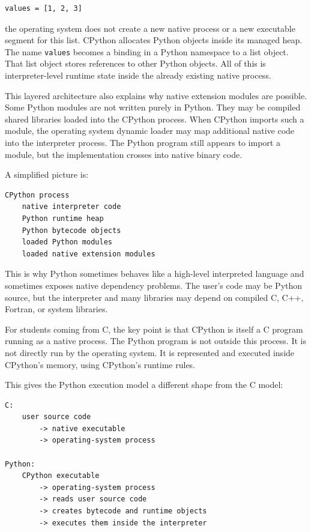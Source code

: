 \begin{verbatim}
values = [1, 2, 3]
\end{verbatim}

the operating system does not create a new native process or a new executable segment for this list. CPython allocates Python objects inside its managed heap. The name \texttt{values} becomes a binding in a Python namespace to a list object. That list object stores references to other Python objects. All of this is interpreter-level runtime state inside the already existing native process.

This layered architecture also explains why native extension modules are possible. Some Python modules are not written purely in Python. They may be compiled shared libraries loaded into the CPython process. When CPython imports such a module, the operating system dynamic loader may map additional native code into the interpreter process. The Python program still appears to import a module, but the implementation crosses into native binary code.

A simplified picture is:

\begin{verbatim}
CPython process
    native interpreter code
    Python runtime heap
    Python bytecode objects
    loaded Python modules
    loaded native extension modules
\end{verbatim}

This is why Python sometimes behaves like a high-level interpreted language and sometimes exposes native dependency problems. The user's code may be Python source, but the interpreter and many libraries may depend on compiled C, C++, Fortran, or system libraries.

For students coming from C, the key point is that CPython is itself a C program running as a native process. The Python program is not outside this process. It is not directly run by the operating system. It is represented and executed inside CPython's memory, using CPython's runtime rules.

This gives the Python execution model a different shape from the C model:

\begin{verbatim}
C:
    user source code
        -> native executable
        -> operating-system process

Python:
    CPython executable
        -> operating-system process
        -> reads user source code
        -> creates bytecode and runtime objects
        -> executes them inside the interpreter
\end{verbatim}


